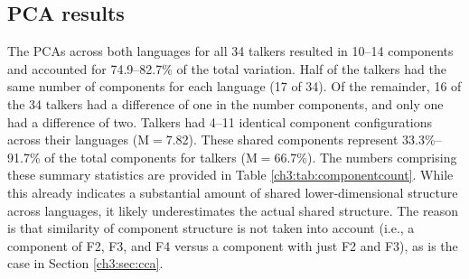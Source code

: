 \subsection{PCA results}\label{ch3:sec:pca_results} 
The PCAs across both languages for all 34 talkers resulted in 10--14 components and accounted for 74.9--82.7\% of the total variation. Half of the talkers had the same number of components for each language (17 of 34). Of the remainder, 16 of the 34 talkers had a difference of one in the number components, and only one had a difference of two. Talkers had 4--11 identical component configurations across their languages (M$=$7.82). These shared components represent 33.3\%--91.7\% of the total components for talkers (M$=$66.7\%). The numbers comprising these summary statistics are provided in Table \ref{ch3:tab:componentcount}. While this already indicates a substantial amount of shared lower-dimensional structure across languages, it likely underestimates the actual shared structure. The reason is that similarity of component structure is not taken into account (i.e., a component of F2, F3, and F4 versus a component with just F2 and F3), as is the case in Section \ref{ch3:sec:cca}. 

